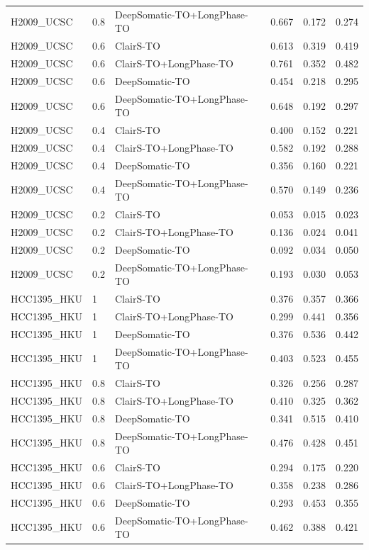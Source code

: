 \documentclass[pdflatex,sn-nature]{sn-jnl}
\begin{document}
{\begin{longtable}{@{}lllccc@{}}
  H2009\_UCSC & 0.8 & DeepSomatic-TO+LongPhase-TO & 0.667 & 0.172 & 0.274 \\
  H2009\_UCSC & 0.6 & ClairS-TO & 0.613 & 0.319 & 0.419 \\
  H2009\_UCSC & 0.6 & ClairS-TO+LongPhase-TO & 0.761 & 0.352 & 0.482 \\
  H2009\_UCSC & 0.6 & DeepSomatic-TO & 0.454 & 0.218 & 0.295 \\
  H2009\_UCSC & 0.6 & DeepSomatic-TO+LongPhase-TO & 0.648 & 0.192 & 0.297 \\
  H2009\_UCSC & 0.4 & ClairS-TO & 0.400 & 0.152 & 0.221 \\
  H2009\_UCSC & 0.4 & ClairS-TO+LongPhase-TO & 0.582 & 0.192 & 0.288 \\
  H2009\_UCSC & 0.4 & DeepSomatic-TO & 0.356 & 0.160 & 0.221 \\
  H2009\_UCSC & 0.4 & DeepSomatic-TO+LongPhase-TO & 0.570 & 0.149 & 0.236 \\
  H2009\_UCSC & 0.2 & ClairS-TO & 0.053 & 0.015 & 0.023 \\
  H2009\_UCSC & 0.2 & ClairS-TO+LongPhase-TO & 0.136 & 0.024 & 0.041 \\
  H2009\_UCSC & 0.2 & DeepSomatic-TO & 0.092 & 0.034 & 0.050 \\
  H2009\_UCSC & 0.2 & DeepSomatic-TO+LongPhase-TO & 0.193 & 0.030 & 0.053 \\
  HCC1395\_HKU & 1 & ClairS-TO & 0.376 & 0.357 & 0.366 \\
  HCC1395\_HKU & 1 & ClairS-TO+LongPhase-TO & 0.299 & 0.441 & 0.356 \\
  HCC1395\_HKU & 1 & DeepSomatic-TO & 0.376 & 0.536 & 0.442 \\
  HCC1395\_HKU & 1 & DeepSomatic-TO+LongPhase-TO & 0.403 & 0.523 & 0.455 \\
  HCC1395\_HKU & 0.8 & ClairS-TO & 0.326 & 0.256 & 0.287 \\
  HCC1395\_HKU & 0.8 & ClairS-TO+LongPhase-TO & 0.410 & 0.325 & 0.362 \\
  HCC1395\_HKU & 0.8 & DeepSomatic-TO & 0.341 & 0.515 & 0.410 \\
  HCC1395\_HKU & 0.8 & DeepSomatic-TO+LongPhase-TO & 0.476 & 0.428 & 0.451 \\
  HCC1395\_HKU & 0.6 & ClairS-TO & 0.294 & 0.175 & 0.220 \\
  HCC1395\_HKU & 0.6 & ClairS-TO+LongPhase-TO & 0.358 & 0.238 & 0.286 \\
  HCC1395\_HKU & 0.6 & DeepSomatic-TO & 0.293 & 0.453 & 0.355 \\
  HCC1395\_HKU & 0.6 & DeepSomatic-TO+LongPhase-TO & 0.462 & 0.388 & 0.421 \\

\end{longtable}}
\end{document}

